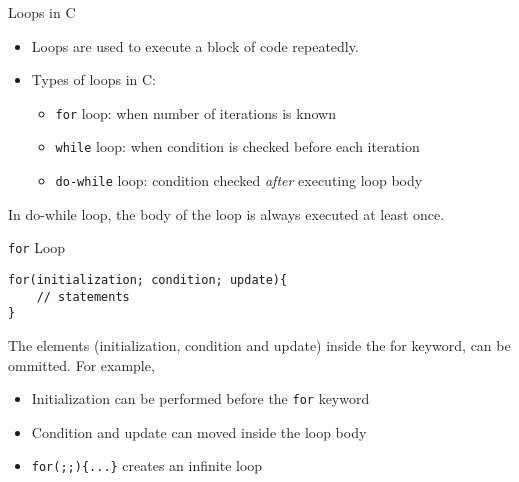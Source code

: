 \documentclass[12pt, aspectratio=169]{beamer}
\begin{document}
    \begin{frame}{Loops in C}
        \begin{itemize}
            \item Loops are used to execute a block of code repeatedly.
            \item Types of loops in C:
            \begin{itemize}
                \item \texttt{for} loop: when number of iterations is known
                \item \texttt{while} loop: when condition is checked before each iteration
                \item \texttt{do-while} loop: condition checked \textit{after} executing loop body
            \end{itemize}
        \end{itemize}

        In do-while loop, the body of the loop is always executed at least once.
    \end{frame}


    \begin{frame}[fragile]{\texttt{for} Loop}
\begin{verbatim}
for(initialization; condition; update){
    // statements
}
        \end{verbatim}

        The elements (initialization, condition and update) inside the for keyword, can be ommitted. For example,
        \begin{itemize}
            \item Initialization can be performed before the \texttt{for} keyword
            \item Condition and update can moved inside the loop body
            \item \texttt{for(;;)\{...\}} creates an infinite loop
        \end{itemize}
    \end{frame}




\end{document}
